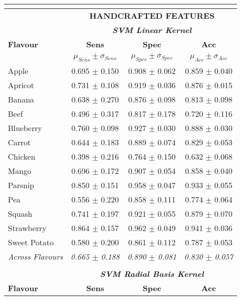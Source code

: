 \documentclass[authoryear]{elsarticle}
\begin{document}
    \begin{tabular}{lccc}
    \multicolumn{4}{c}{}\\
    \toprule
    	& \multicolumn{3}{c}{\textbf{HANDCRAFTED FEATURES}} \\
        & \multicolumn{3}{c}{\textit{\textbf{SVM Linear Kernel}}}\\
    \midrule
    \textbf{Flavour} & \textbf{Sens} & \textbf{Spec} & \textbf{Acc}\\
    & $\mu_{Sens} \pm \sigma_{Sens}$ & $\mu_{Spec} \pm \sigma_{Spec}$ & $\mu_{Acc} \pm \sigma_{Acc}$ \\
    \midrule
    Apple 		 & 0.695 $\pm$ 0.150 & 0.908 $\pm$ 0.062 & 0.859 $\pm$ 0.040 \\
    Apricot 	 & 0.731 $\pm$ 0.108 & 0.919 $\pm$ 0.036 & 0.876 $\pm$ 0.015 \\
    Banana 		 & 0.638 $\pm$ 0.270 & 0.876 $\pm$ 0.098 & 0.813 $\pm$ 0.098 \\
    Beef 		 & 0.496 $\pm$ 0.317 & 0.817 $\pm$ 0.178 & 0.720 $\pm$ 0.116 \\
    Blueberry 	 & 0.760 $\pm$ 0.098 & 0.927 $\pm$ 0.030 & 0.888 $\pm$ 0.030 \\
    Carrot 		 & 0.644 $\pm$ 0.183 & 0.889 $\pm$ 0.074 & 0.829 $\pm$ 0.053 \\
    Chicken 	 & 0.398 $\pm$ 0.216 & 0.764 $\pm$ 0.150 & 0.632 $\pm$ 0.068 \\
    Mango 		 & 0.696 $\pm$ 0.172 & 0.907 $\pm$ 0.054 & 0.858 $\pm$ 0.040 \\
    Parsnip 	 & 0.850 $\pm$ 0.151 & 0.958 $\pm$ 0.047 & 0.933 $\pm$ 0.055 \\
    Pea 		 & 0.556 $\pm$ 0.220 & 0.858 $\pm$ 0.111 & 0.774 $\pm$ 0.064 \\
    Squash 		 & 0.741 $\pm$ 0.197 & 0.921 $\pm$ 0.055 & 0.879 $\pm$ 0.070 \\
    Strawberry 	 & 0.864 $\pm$ 0.157 & 0.962 $\pm$ 0.049 & 0.941 $\pm$ 0.036 \\
    Sweet Potato & 0.580 $\pm$ 0.200 & 0.861 $\pm$ 0.112 & 0.787 $\pm$ 0.053 \\
    \midrule
    \textit{Across Flavours} & \textit{0.665 $\pm$ 0.188} & \textit{0.890 $\pm$ 0.081} & \textit{0.830 $\pm$ 0.057} \\
    \midrule
    \multicolumn{4}{c}{}\\
    \midrule
        & \multicolumn{3}{c}{\textit{\textbf{SVM Radial Basis Kernel}}}\\
    \midrule
    \textbf{Flavour} & \textbf{Sens} & \textbf{Spec} & \textbf{Acc}\\

\end{tabular}
\end{document}
